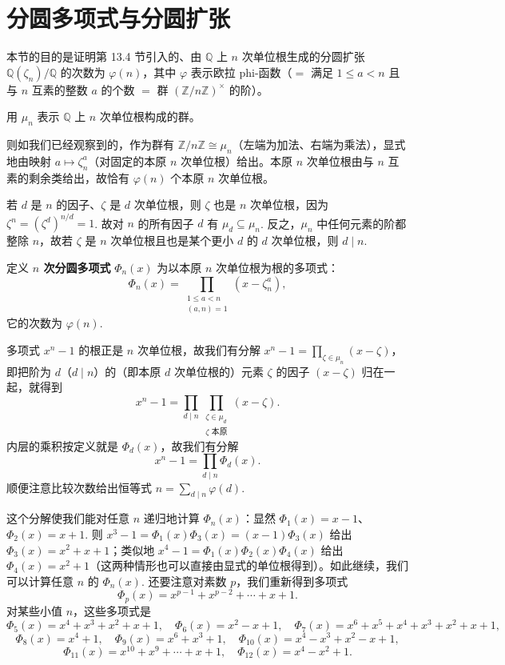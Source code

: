 \section{分圆多项式与分圆扩张}

本节的目的是证明第 13.4 节引入的、由 \(\mathbb{Q}\) 上 \(n\) 次单位根生成的分圆扩张 \(\mathbb{Q}(\zeta_n)/\mathbb{Q}\) 的次数为 \(\varphi(n)\)，其中 \(\varphi\) 表示欧拉 phi-函数（\(=\) 满足 \(1 \leq a < n\) 且与 \(n\) 互素的整数 \(a\) 的个数 \(=\) 群 \((\mathbb{Z}/n\mathbb{Z})^\times\) 的阶）。

\begin{definition}
用 \(\mu_n\) 表示 \(\mathbb{Q}\) 上 \(n\) 次单位根构成的群。
\end{definition}

则如我们已经观察到的，作为群有 \(\mathbb{Z}/n\mathbb{Z} \cong \mu_n\)（左端为加法、右端为乘法），显式地由映射 \(a \mapsto \zeta_n^a\)（对固定的本原 \(n\) 次单位根）给出。本原 \(n\) 次单位根由与 \(n\) 互素的剩余类给出，故恰有 \(\varphi(n)\) 个本原 \(n\) 次单位根。

若 \(d\) 是 \(n\) 的因子、\(\zeta\) 是 \(d\) 次单位根，则 \(\zeta\) 也是 \(n\) 次单位根，因为 \(\zeta^n = (\zeta^d)^{n/d} = 1\). 故对 \(n\) 的所有因子 \(d\) 有 \(\mu_d \subseteq \mu_n\). 反之，\(\mu_n\) 中任何元素的阶都整除 \(n\)，故若 \(\zeta\) 是 \(n\) 次单位根且也是某个更小 \(d\) 的 \(d\) 次单位根，则 \(d \mid n\).

\begin{definition}
定义 \textbf{\(n\) 次分圆多项式} \(\Phi_n(x)\) 为以本原 \(n\) 次单位根为根的多项式：
\[
\Phi_n(x) = \prod_{\substack{1 \leq a < n \\ (a, n) = 1}}(x-\zeta_n^a),
\]
它的次数为 \(\varphi(n)\).
\end{definition}

多项式 \(x^n-1\) 的根正是 \(n\) 次单位根，故我们有分解 \(x^n-1 = \prod_{\zeta \in \mu_n}(x-\zeta)\)，即把阶为 \(d\)（\(d \mid n\)）的（即本原 \(d\) 次单位根的）元素 \(\zeta\) 的因子 \((x-\zeta)\) 归在一起，就得到
\[
x^n-1 = \prod_{d \mid n}\prod_{\substack{\zeta \in \mu_d \\ \zeta \text{ 本原}}}(x-\zeta).
\]
内层的乘积按定义就是 \(\Phi_d(x)\)，故我们有分解
\begin{equation}
x^n-1 = \prod_{d \mid n}\Phi_d(x). \tag{13.4}
\end{equation}
顺便注意比较次数给出恒等式 \(n = \sum_{d \mid n}\varphi(d)\).

这个分解使我们能对任意 \(n\) 递归地计算 \(\Phi_n(x)\)：显然 \(\Phi_1(x) = x-1\)、\(\Phi_2(x) = x+1\). 则 \(x^3-1 = \Phi_1(x)\Phi_3(x) = (x-1)\Phi_3(x)\) 给出 \(\Phi_3(x) = x^2+x+1\)；类似地 \(x^4-1 = \Phi_1(x)\Phi_2(x)\Phi_4(x)\) 给出 \(\Phi_4(x) = x^2+1\)（这两种情形也可以直接由显式的单位根得到）。如此继续，我们可以计算任意 \(n\) 的 \(\Phi_n(x)\). 还要注意对素数 \(p\)，我们重新得到多项式
\[
\Phi_p(x) = x^{p-1}+x^{p-2}+\cdots+x+1.
\]
对某些小值 \(n\)，这些多项式是
\[
\Phi_5(x) = x^4+x^3+x^2+x+1, \quad \Phi_6(x) = x^2-x+1, \quad \Phi_7(x) = x^6+x^5+x^4+x^3+x^2+x+1,
\]
\[
\Phi_8(x) = x^4+1, \quad \Phi_9(x) = x^6+x^3+1, \quad \Phi_{10}(x) = x^4-x^3+x^2-x+1,
\]
\[
\Phi_{11}(x) = x^{10}+x^9+\cdots+x+1, \quad \Phi_{12}(x) = x^4-x^2+1.
\]

